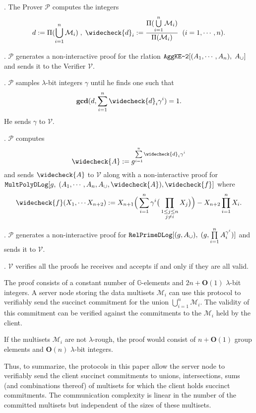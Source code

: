 \documentclass[11pt, lettersize, notitlepage, leqno, footskip=0.6cm]{article}
\newcommand{\pl}{\prod\limits}
\newcommand{\slim}{\sum\limits}
\newcommand{\ttt}{\texttt}
\newcommand{\bG}{\mathbb{G}}
\newcommand{\mc}{\mathcal}
\newcommand{\mbf}{\mathbf}
\newcommand{\lam}{\lambda}
\newcommand{\weck}{\widecheck}
\newcommand{\bO}{\mbf{O}}
\newcommand{\mP}{\mc{P}}
\newcommand{\V}{\mc{V}}
\newcommand{\mcM}{\mc{M}}
\newcommand{\vs}{\vspace{-0.15cm}}
\newcommand{\noin}{\noindent}
\newcommand{\GCD}{\mbf{gcd}}
\numberwithin{equation}{section}
\begin{document}
\begin{prf1} \normalfont \noin 1. The Prover $\mP$ computes the integers \vspace{-0.25cm} $$d:= \Pi(\bigcup\limits_{i=1}^n \mc{M}_i)\;,\;\weck{d}_i:= \frac{\Pi(\bigcup\limits_{i=1}^n \mc{M}_i)}{\Pi(\mcM_i)}\;\;(i=1,\cdots,n).$$

\noin 2. $\mP$ generates a non-interactive proof for the rlation $\ttt{AggKE-2}[(A_1,\cdots,A_n),\;A_{\tt{\cup}}]$ and sends it to the Verifier $\V$.


\noin 3. $\mP$ samples $\lam$-bit integers $\gamma$ until he finds one such that \vs $$ \GCD(d, \slim_{i=1}^n \weck{d}_i\gamma^i) =1.$$ He sends $\gamma$ to $\V$.

\noin 4. $\mP$ computes \vs $$\weck{A}:= g^{\slim_{i=1}^n \weck{d}_i\gamma^i}$$ and sends $\weck{A}$ to $\V$ along with a non-interactive proof for $\ttt{MultPolyDLog}[g,\;(A_1,\cdots, A_n, A_{\tt{\cup}}, \weck{A}), \weck{f}]$ where \vs $$\weck{f}(X_1,\cdots X_{n+2}):= X_{n+1}\Big(\slim_{i=1}^n \gamma^i\big(\pl_{\substack{1\leq j\leq n\\ j\neq i}} X_j\big)\Big) - X_{n+2}\pl_{i=1}^n X_i.$$


\noin 5. $\mP$ generates a non-interactive proof for $\ttt{RelPrimeDLog}[(g, A_{\tt{\cup}}),\;(g, \pl_{i=1}^n A_i^{\gamma^i})]$ and sends it to $\V$.

\noin 6. $\V$ verifies all the proofs he receives and accepts if and only if they are all valid. \end{prf1}

\noin The proof consists of a constant number of $\bG$-elements and $2n+\bO(1)$ $\lam$-bit integers. A server node storing the data multisets $\mcM_i$ can use this protocol to verifiably send the succinct commitment for the union $\bigcup\limits_{i=1}^n \mcM_i$. The validity of this commitment can be verified against the commitments to the $\mcM_i$ held by the client.

If the multisets $\mcM_i$ are not $\lam$-rough, the proof would consist of $n+\bO(1)$ group elements and $\bO(n)$ $\lam$-bit integers.

\bigskip

Thus, to summarize, the protocols in this paper allow the server node to verifiably send the client succinct commitments to unions, intersections, sums (and combinations thereof) of multisets for which the client holds succinct commitments.  The communication complexity is linear in the number of the committed multisets but independent of the sizes of these multisets.
\end{document}
